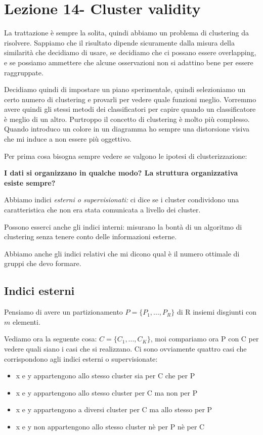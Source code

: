 \documentclass[12pt, a4paper,titlepage,openany]{article}
\begin{document}
\section{Lezione 14- Cluster validity}	

La trattazione è sempre la solita, quindi abbiamo un problema di clustering da risolvere. Sappiamo che il risultato dipende sicuramente dalla misura della similarità che decidiamo di usare, se decidiamo che ci possano essere overlapping, e se possiamo ammettere che alcune osservazioni non si adattino bene per essere raggruppate.

Decidiamo quindi di impostare un piano sperimentale, quindi selezioniamo un certo numero di clustering e provarli per vedere quale funzioni meglio. Vorremmo avere quindi gli stessi metodi dei classificatori per capire quando un classificatore è meglio di un altro. Purtroppo il concetto di clustering è molto più complesso. Quando introduco un colore in un diagramma ho sempre una distorsione visiva che mi induce a non essere più oggettivo.

Per prima cosa bisogna sempre vedere se valgono le ipotesi di clusterizzazione:

\textbf{I dati si organizzano in qualche modo? La struttura organizzativa esiste sempre?}

Abbiamo indici \textit{esterni o supervisionati:} ci dice se i cluster condividono una caratteristica che non era stata comunicata a livello dei cluster.

Possono esserci anche gli indici interni: misurano la bontà di un algoritmo di clustering senza tenere conto delle informazioni esterne.

Abbiamo anche gli indici relativi che mi dicono qual è il numero ottimale di gruppi che devo formare.

\subsection{Indici esterni}

Pensiamo di avere un partizionamento $P = \{P_{1}, ..., P_{R}\}$ di R insiemi disgiunti con $m$ elementi. 

Vediamo ora la seguente cosa: $C = \{C_{1}, ..., C_{K}\}$, moi compariamo ora P con C per vedere 	quali siano i casi che si realizzano.
Ci sono ovviamente quattro casi che corrispondono agli indici esterni o supervisionate:

\begin{itemize}
	\item x e y appartengono allo stesso cluster sia per C che per P
	\item x e y appartengono allo stesso cluster per C ma non per P
	\item x e y appartengono a diversi cluster per C ma allo stesso per P
	\item x e y non appartengono allo stesso cluster nè per P nè per C
\end{itemize}
\end{document}

